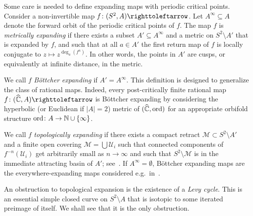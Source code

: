 \documentclass{amsart}
\begin{document}
Some care is needed to define expanding maps with periodic critical
points.  Consider a non-invertible map $f\colon (S^2,A)\selfmap$. Let
$A^\infty\subseteq A$ denote the forward orbit of the periodic
critical points of $f$. The map $f$ is \emph{metrically expanding} if
there exists a subset $A'\subseteq A^\infty$ and a metric on
$S^2\setminus A'$ that is expanded by $f$, and such that at all
$a\in A'$ the first return map of $f$ is locally conjugate to
$z\mapsto z^{\deg_a(f^n)}$. In other words, the points in $A'$ are
cusps, or equivalently at infinite distance, in the metric.

We call $f$ \emph{B\"ottcher expanding} if $A'=A^\infty$. This
definition is designed to generalize the class of rational
maps. Indeed, every post-critically finite rational map
$f\colon (\hC,A)\selfmap $ is B\"ottcher expanding by considering the
hyperbolic (or Euclidean if $|A|=2$) metric of $({\widehat{{\mathbb C}}},\operatorname{ord})$ for an
appropriate orbifold structure $\operatorname{ord}\colon A\to {\mathbb N}\cup \{\infty\}$.

We call $f$ \emph{topologically expanding} if there exists a compact
retract $\mathcal M\subset S^2\setminus A'$ and a finite open covering
$\mathcal M=\bigcup\mathcal U_i$ such that connected components of
$f^{-n}(\mathcal U_i)$ get arbitrarily small as $n\to\infty$ and such
that $S^2\setminus \mathcal M$ is in the immediate attracting basin of
$A'$; see~\cite{bartholdi-h-n:aglt}.  If $A^\infty=\emptyset$,
B\"ottcher expanding maps are the everywhere-expanding maps considered
e.g.\ in~\cites{haissinsky-pilgrim:cxc,bonk-meyer:etm}.

An obstruction to topological expansion is the existence of a
\emph{Levy cycle}. This is an essential simple closed curve on
$S^2\setminus A$ that is isotopic to some iterated preimage of
itself. We shall see that it is the only obstruction.
\end{document}
